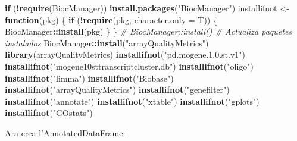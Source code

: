 \documentclass[
]{article}
\newenvironment{Shaded}{\begin{snugshade}}{\end{snugshade}}
\newcommand{\AttributeTok}[1]{\textcolor[rgb]{0.13,0.29,0.53}{#1}}
\newcommand{\CommentTok}[1]{\textcolor[rgb]{0.56,0.35,0.01}{\textit{#1}}}
\newcommand{\ConstantTok}[1]{\textcolor[rgb]{0.56,0.35,0.01}{#1}}
\newcommand{\ControlFlowTok}[1]{\textcolor[rgb]{0.13,0.29,0.53}{\textbf{#1}}}
\newcommand{\FunctionTok}[1]{\textcolor[rgb]{0.13,0.29,0.53}{\textbf{#1}}}
\newcommand{\NormalTok}[1]{#1}
\newcommand{\OtherTok}[1]{\textcolor[rgb]{0.56,0.35,0.01}{#1}}
\newcommand{\SpecialCharTok}[1]{\textcolor[rgb]{0.81,0.36,0.00}{\textbf{#1}}}
\newcommand{\StringTok}[1]{\textcolor[rgb]{0.31,0.60,0.02}{#1}}
\begin{document}
\begin{Shaded}
\begin{Highlighting}[]
\ControlFlowTok{if}\NormalTok{ (}\SpecialCharTok{!}\FunctionTok{require}\NormalTok{(BiocManager)) }\FunctionTok{install.packages}\NormalTok{(}\StringTok{"BiocManager"}\NormalTok{)}
\NormalTok{installifnot }\OtherTok{\textless{}{-}} \ControlFlowTok{function}\NormalTok{(pkg) \{}
    \ControlFlowTok{if}\NormalTok{ (}\SpecialCharTok{!}\FunctionTok{require}\NormalTok{(pkg, }\AttributeTok{character.only =}\NormalTok{ T)) \{}
\NormalTok{        BiocManager}\SpecialCharTok{::}\FunctionTok{install}\NormalTok{(pkg)}
\NormalTok{    \}}
\NormalTok{\}}
\CommentTok{\# BiocManager::install() \# Actualiza paquetes instalados}
\NormalTok{BiocManager}\SpecialCharTok{::}\FunctionTok{install}\NormalTok{(}\StringTok{"arrayQualityMetrics"}\NormalTok{)}
\FunctionTok{library}\NormalTok{(arrayQualityMetrics)}
\FunctionTok{installifnot}\NormalTok{(}\StringTok{"pd.mogene.1.0.st.v1"}\NormalTok{)}
\FunctionTok{installifnot}\NormalTok{(}\StringTok{"mogene10sttranscriptcluster.db"}\NormalTok{)}
\FunctionTok{installifnot}\NormalTok{(}\StringTok{"oligo"}\NormalTok{)}
\FunctionTok{installifnot}\NormalTok{(}\StringTok{"limma"}\NormalTok{)}
\FunctionTok{installifnot}\NormalTok{(}\StringTok{"Biobase"}\NormalTok{)}
\FunctionTok{installifnot}\NormalTok{(}\StringTok{"arrayQualityMetrics"}\NormalTok{)}
\FunctionTok{installifnot}\NormalTok{(}\StringTok{"genefilter"}\NormalTok{)}
\FunctionTok{installifnot}\NormalTok{(}\StringTok{"annotate"}\NormalTok{)}
\FunctionTok{installifnot}\NormalTok{(}\StringTok{"xtable"}\NormalTok{)}
\FunctionTok{installifnot}\NormalTok{(}\StringTok{"gplots"}\NormalTok{)}
\FunctionTok{installifnot}\NormalTok{(}\StringTok{"GOstats"}\NormalTok{)}
\end{Highlighting}
\end{Shaded}

Ara crea l'AnnotatedDataFrame:

\begin{Shaded}
\end{Shaded}
\end{document}
